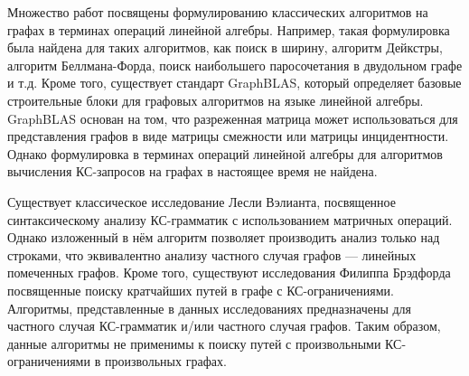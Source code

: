 



{\progress}
Множество работ посвящены формулированию классических алгоритмов на графах в терминах операций линейной алгебры. Например, такая формулировка была найдена для таких алгоритмов, как поиск в ширину, алгоритм Дейкстры, алгоритм Беллмана-Форда, поиск наибольшего паросочетания в двудольном графе и т.д. Кроме того, существует стандарт GraphBLAS, который определяет базовые строительные блоки для графовых алгоритмов на языке линейной алгебры. GraphBLAS основан на том, что разреженная матрица может использоваться для представления графов в виде матрицы смежности или матрицы инцидентности. Однако формулировка в терминах операций линейной алгебры для алгоритмов вычисления КС-запросов на графах в настоящее время не найдена.

Существует классическое исследование Лесли Вэлианта, посвященное синтаксическому анализу КС-грамматик с использованием матричных операций. Однако изложенный в нём алгоритм позволяет производить анализ только над строками, что эквивалентно анализу частного случая графов --- линейных помеченных графов. Кроме того, существуют исследования Филиппа Брэдфорда посвященные поиску кратчайших путей в графе с КС-ограничениями. Алгоритмы, представленные в данных исследованиях предназначены для частного случая КС-грамматик и/или частного случая графов. Таким образом, данные алгоритмы не применимы к поиску путей с произвольными КС-ограничениями в произвольных графах.

